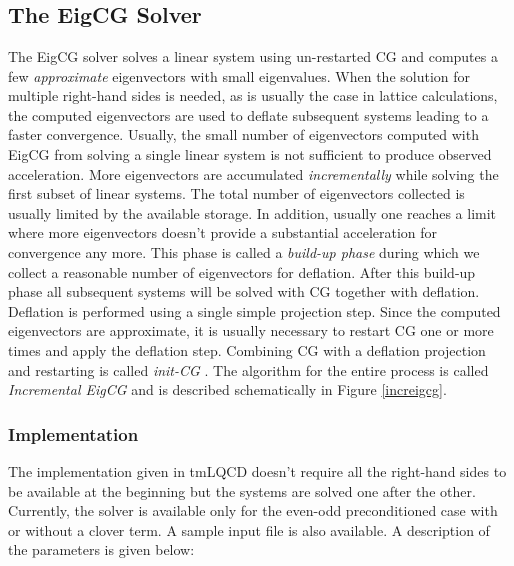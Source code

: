 \documentclass[a4paper,10pt]{article}
\title{}
\author{}
\begin{document}
\maketitle

\begin{abstract}

\end{abstract}

\section{}

\subsection{The EigCG Solver}
The EigCG solver \cite{Stathopoulos:2007zi} solves a  linear system using un-restarted CG and computes a few {\it approximate} eigenvectors with small eigenvalues. 
When the solution for multiple right-hand sides is needed, as is usually the case in lattice calculations, the computed eigenvectors are used to deflate subsequent 
systems leading to a faster convergence. Usually, the small number of eigenvectors computed with EigCG from solving a single linear system is not sufficient to 
produce observed acceleration. More eigenvectors are accumulated {\it incrementally} while solving the first subset of linear systems. The total
number of eigenvectors collected is usually limited by the available storage. In addition, usually one reaches a limit where more eigenvectors doesn't provide a 
substantial acceleration for convergence any more. This phase is called a {\it build-up phase} during which we collect a reasonable number of eigenvectors for deflation. 
After this build-up phase all subsequent systems will be solved with CG together with deflation. Deflation is performed using a single simple projection step. Since 
the computed eigenvectors are approximate, it is usually necessary to restart CG one or more times and apply the deflation step. Combining CG with a deflation projection and restarting
is called {\it init-CG} \cite{Stathopoulos:2007zi}. The algorithm for the entire process is called {\it Incremental EigCG} and is described schematically in Figure \ref{increigcg}.
\subsubsection{Implementation}
The implementation given in tmLQCD doesn't require all the right-hand sides to be available at the beginning but the systems are solved one after the other. Currently, the solver is available only
for the even-odd preconditioned case with or without a clover term. A sample input file is also available. A description of the parameters is given below:
\end{document}
